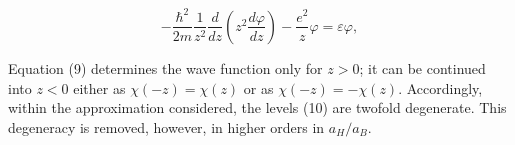 
\begin{equation}
 -\frac{\hbar^2}{2m}\frac1{z^2}\frac d{dz}\left(z^2\frac{d\varphi}{dz}\right)-\frac{e^2}{z}\varphi=\varepsilon\varphi,
 \tag{9}
\end{equation}


Equation (9) determines the wave function only for $z>0$; it can be continued into $z<0$ either as $\chi(-z)=\chi(z)$ or as $\chi(-z)=-\chi(z)$. Accordingly, within the approximation considered, the levels (10) are twofold degenerate. This degeneracy is removed, however, in higher orders in $a_H/a_B$.
